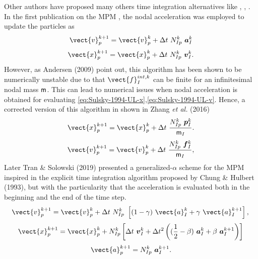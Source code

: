 Other authors have proposed many others time integration alternatives
like \cite{Guilkey2003}, \cite{Tran2019e}, \cite{Charlton2017}. In the
first publication on the MPM \cite{Sulsky1994}, the nodal acceleration
was employed to update the particles as
\begin{equation}
  \label{eq:Sulsky-1994-UL-v}
  \vect{v}_p^{k+1} = \vect{v}_p^{k} + \Delta t\ N_{Ip}^{k}\ \vec{a}_{I}^{k}
\end{equation}
\begin{equation}
  \label{eq:Sulsky-1994-UL-x}
  \vect{x}_p^{k+1} = \vect{x}_p^{k} + \Delta t\ N_{Ip}^{k}\ \vec{v}_{I}^{k}.
\end{equation}
However, as Andersen (2009)\cite{thesis_Andersen_2009} point out, this algorithm has been shown to be numerically unstable due to that
$\vect{f}_I^{int,k}$ can be finite for an infinitesimal nodal mass
$\mathsf{m}$. This can lead to numerical issues when nodal acceleration
is obtained for evaluating \eqref{eq:Sulsky-1994-UL-x},\eqref{eq:Sulsky-1994-UL-v}. Hence, a
corrected version of this algorithm in shown in Zhang {\it et al.}
(2016)\cite{Zhang_book_2016}
\begin{equation}
  \label{eq:Zhang-2016-UL-x}
  \vect{x}_p^{k+1} = \vect{x}_p^{k} + \Delta t\ \frac{N_{Ip}^{k}\ \vec{p}_{I}^{k}}{\tens{m}_I}.  
\end{equation}
\begin{equation}
  \label{eq:Zhang-2016-UL-v}
  \vect{v}_p^{k+1} = \vect{v}_p^{k} + \Delta t\ \frac{N_{Ip}^{k}\ \vec{f}_{I}^{k}}{\tens{m}_I},
\end{equation}
Later Tran \& Solowski (2019)\cite{Tran2019e} presented a
generalized-$\alpha$ scheme for the MPM inspired in the explicit time
integration algorithm proposed by Chung \& Hulbert
(1993)\cite{Geranlized_alpha_1993}, but with the particularity that
the acceleration is evaluated both in the beginning and the end of the
time step.
\begin{equation}
  \label{eq:Tran-2019-GA-v}
  \vect{v}_p^{k+1} = \vect{v}_p^{k} + \Delta t\  N_{Ip}^{k}\ \left[(1 - \gamma)\ \vect{a}_I^{k} +
    \gamma\ \vect{a}_I^{k+1} \right],\\
\end{equation}
\begin{equation}
\label{eq:Tran-2019-GA-x}
  \vect{x}_p^{k+1} = \vect{x}_p^{k} + N_{Ip}^{k} \left[ \Delta t\ \vec{v}_{I}^{k}+ \Delta t^2\left( (\frac{1}{2} - \beta)\
    \vec{a}_{I}^{k} + \beta\ \vec{a}_{I}^{k+1} \right) \right]
\end{equation}
\begin{equation}
  \label{eq:Tran-2019-GA-a}
  \vect{a}_p^{k+1} = N_{Ip}^{k}\ \vec{a}_{I}^{k+1}.
\end{equation}

